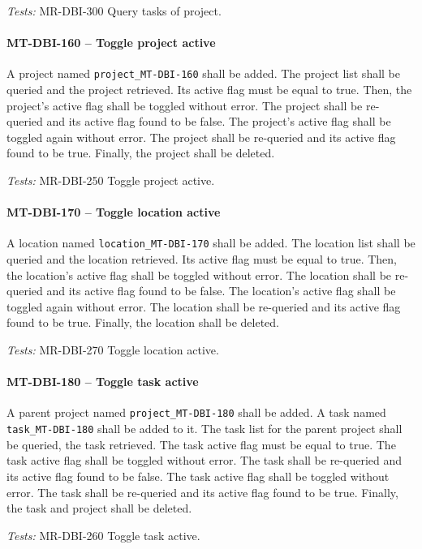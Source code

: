 \textit{Tests: } MR-DBI-300 Query tasks of project.

\paragraph{MT-DBI-160 -- Toggle project active}
A project named \lstinline{project_MT-DBI-160} shall be added.
The project list shall be queried and the project retrieved.
Its active flag must be equal to true.
Then, the project's active flag shall be toggled without error.
The project shall be re-queried and its active flag found to be false.
The project's active flag shall be toggled again without error.
The project shall be re-queried and its active flag found to be true.
Finally, the project shall be deleted.

\textit{Tests: } MR-DBI-250 Toggle project active.

\paragraph{MT-DBI-170 -- Toggle location active}
A location named \lstinline{location_MT-DBI-170} shall be added.
The location list shall be queried and the location retrieved.
Its active flag must be equal to true.
Then, the location's active flag shall be toggled without error.
The location shall be re-queried and its active flag found to be false.
The location's active flag shall be toggled again without error.
The location shall be re-queried and its active flag found to be true.
Finally, the location shall be deleted.

\textit{Tests: } MR-DBI-270 Toggle location active.

\paragraph{MT-DBI-180 -- Toggle task active}
A parent project named \lstinline{project_MT-DBI-180} shall be added.
A task named \lstinline{task_MT-DBI-180} shall be added to it.
The task list for the parent project shall be queried, the task retrieved.
The task active flag must be equal to true.
The task active flag shall be toggled without error.
The task shall be re-queried and its active flag found to be false.
The task active flag shall be toggled without error.
The task shall be re-queried and its active flag found to be true.
Finally, the task and project shall be deleted.

\textit{Tests: } MR-DBI-260 Toggle task active.

